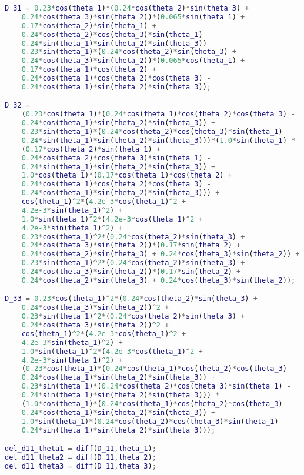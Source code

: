 \begin{anexosenv}
\begin{lstlisting}[language=Matlab]
D_31 = 0.23*cos(theta_1)*(0.24*cos(theta_2)*sin(theta_3) + 
    0.24*cos(theta_3)*sin(theta_2))*(0.065*sin(theta_1) +
    0.17*cos(theta_2)*sin(theta_1) + 
    0.24*cos(theta_2)*cos(theta_3)*sin(theta_1) -
    0.24*sin(theta_1)*sin(theta_2)*sin(theta_3)) - 
    0.23*sin(theta_1)*(0.24*cos(theta_2)*sin(theta_3) +
    0.24*cos(theta_3)*sin(theta_2))*(0.065*cos(theta_1) + 
    0.17*cos(theta_1)*cos(theta_2) +
    0.24*cos(theta_1)*cos(theta_2)*cos(theta_3) - 
    0.24*cos(theta_1)*sin(theta_2)*sin(theta_3));

D_32 = 
    (0.23*cos(theta_1)*(0.24*cos(theta_1)*cos(theta_2)*cos(theta_3) - 
    0.24*cos(theta_1)*sin(theta_2)*sin(theta_3)) +
    0.23*sin(theta_1)*(0.24*cos(theta_2)*cos(theta_3)*sin(theta_1) - 
    0.24*sin(theta_1)*sin(theta_2)*sin(theta_3)))*(1.0*sin(theta_1) * 
    (0.17*cos(theta_2)*sin(theta_1) + 
    0.24*cos(theta_2)*cos(theta_3)*sin(theta_1) -
    0.24*sin(theta_1)*sin(theta_2)*sin(theta_3)) + 
    1.0*cos(theta_1)*(0.17*cos(theta_1)*cos(theta_2) +
    0.24*cos(theta_1)*cos(theta_2)*cos(theta_3) - 
    0.24*cos(theta_1)*sin(theta_2)*sin(theta_3))) +
    cos(theta_1)^2*(4.2e-3*cos(theta_1)^2 + 
    4.2e-3*sin(theta_1)^2) +
    1.0*sin(theta_1)^2*(4.2e-3*cos(theta_1)^2 +
    4.2e-3*sin(theta_1)^2) + 
    0.23*cos(theta_1)^2*(0.24*cos(theta_2)*sin(theta_3) +
    0.24*cos(theta_3)*sin(theta_2))*(0.17*sin(theta_2) +
    0.24*cos(theta_2)*sin(theta_3) + 0.24*cos(theta_3)*sin(theta_2)) + 
    0.23*sin(theta_1)^2*(0.24*cos(theta_2)*sin(theta_3) +
    0.24*cos(theta_3)*sin(theta_2))*(0.17*sin(theta_2) +
    0.24*cos(theta_2)*sin(theta_3) + 0.24*cos(theta_3)*sin(theta_2));

D_33 = 0.23*cos(theta_1)^2*(0.24*cos(theta_2)*sin(theta_3) + 
    0.24*cos(theta_3)*sin(theta_2))^2 +
    0.23*sin(theta_1)^2*(0.24*cos(theta_2)*sin(theta_3) + 
    0.24*cos(theta_3)*sin(theta_2))^2 +
    cos(theta_1)^2*(4.2e-3*cos(theta_1)^2 + 
    4.2e-3*sin(theta_1)^2) +
    1.0*sin(theta_1)^2*(4.2e-3*cos(theta_1)^2 +
    4.2e-3*sin(theta_1)^2) + 
    (0.23*cos(theta_1)*(0.24*cos(theta_1)*cos(theta_2)*cos(theta_3) - 
    0.24*cos(theta_1)*sin(theta_2)*sin(theta_3)) + 
    0.23*sin(theta_1)*(0.24*cos(theta_2)*cos(theta_3)*sin(theta_1) - 
    0.24*sin(theta_1)*sin(theta_2)*sin(theta_3))) * 
    (1.0*cos(theta_1)*(0.24*cos(theta_1)*cos(theta_2)*cos(theta_3) - 
    0.24*cos(theta_1)*sin(theta_2)*sin(theta_3)) +
    1.0*sin(theta_1)*(0.24*cos(theta_2)*cos(theta_3)*sin(theta_1) - 
    0.24*sin(theta_1)*sin(theta_2)*sin(theta_3)));

del_d11_theta1 = diff(D_11,theta_1);
del_d11_theta2 = diff(D_11,theta_2);
del_d11_theta3 = diff(D_11,theta_3);


\end{lstlisting}
\end{anexosenv}
